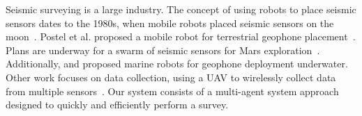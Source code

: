 Seismic surveying is a large industry.
The concept of using robots to place seismic sensors dates to the 1980s, when mobile robots placed seismic sensors on the moon~\cite{LSisMSE81}. Postel et al. proposed a mobile robot for terrestrial geophone placement~\cite{DSSMaA14}. Plans are underway for a swarm of seismic sensors for Mars exploration~\cite{MAPL2006}.
Additionally, \cite{muyzert2015marine} and \cite{postel2014drone} proposed marine robots for geophone deployment underwater. 
Other work  focuses on data collection, using a UAV to wirelessly collect data from multiple sensors~\cite{wilcox2013seismic}. 
Our system consists of a multi-agent system approach designed to quickly and efficiently perform a survey.


